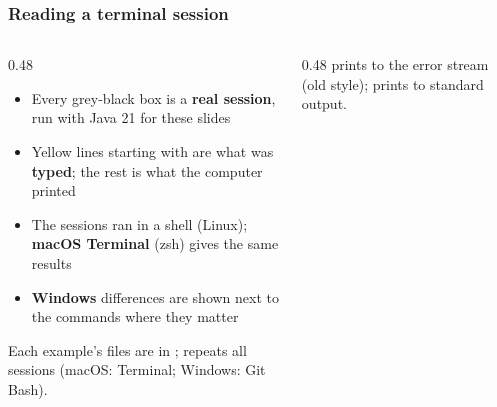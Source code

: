 \documentclass[aspectratio=169,10pt,compress]{beamer}
\begin{document}
\begin{frame}[t,fragile] \frametitle{Reading a terminal session}
  \begin{columns}[T]
    \begin{column}{0.48\textwidth}
      \begin{itemize}\small
        \item Every grey-black box is a \textbf{real session}, run with Java 21 for these slides
        \item Yellow lines starting with \hCode{\$} are what was \textbf{typed}; the rest is what the computer printed
        \item The sessions ran in a  shell (Linux); \textbf{macOS Terminal} (zsh) gives the same results
        \item \textbf{Windows} differences are shown next to the commands where they matter
      \end{itemize}
      \vspace{0.3em}
      \small Each example's files are in ;  repeats all sessions
      (macOS: Terminal; Windows: Git Bash).
    \end{column}
    \begin{column}{0.48\textwidth}
      \small {} prints to the error stream (old style);  prints to standard output.
    \end{column}
  \end{columns}
\end{frame}
\end{document}
